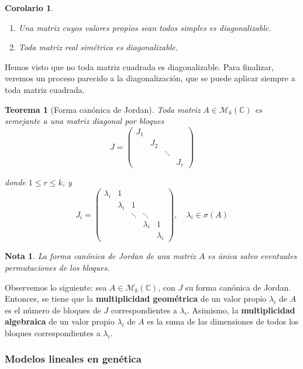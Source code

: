 \documentclass[11pt, a4paper]{article}
\newif\IfInSansMode
\numberwithin{equation}{section}
\newcommand{\la}{\lambda}
\theoremstyle{theorem-style}
\newtheorem{nth}{Teorema}[section]
\newtheorem{ncor}{Corolario}[section]
\theoremstyle{definition-style}
\theoremstyle{remark-style}
\newtheorem*{nota}{Nota}
\theoremstyle{example-style}
\newenvironment{nlist}
{\begin{enumerate}
    \renewcommand\labelenumi{(\emph{\roman{enumi})}}}
  {\end{enumerate}}
\begin{document}
\begin{ncor} \hfill
  \begin{nlist}
  \item Una matriz cuyos valores propios sean todos simples es diagonalizable.
  \item Toda matriz real simétrica es diagonalizable.
  \end{nlist}
\end{ncor}

Hemos visto que no toda matriz cuadrada es diagonalizable. Para finalizar, veremos un proceso parecido a la diagonalización, que se puede aplicar siempre a toda matriz cuadrada.

\begin{nth}[Forma canónica de Jordan]
  Toda matriz $A \in \mathcal M_k (\mathbb C)$ es semejante a una matriz
  diagonal por bloques $$ J =
  \begin{pmatrix}
    J_1 & & & \\
    & J_2 & & \\
    & & \ddots & \\
    & & & J_r
  \end{pmatrix}$$

  donde $1 \leq r \leq k$, y $$J_i = 
  \begin{pmatrix}
	\la_i & 1\\
	& \la_i & 1 \\
	& & \ddots & \ddots \\
	& & & \la_i & 1 \\
	& & & & \la_i
\end{pmatrix}, \quad \lambda_i \in \sigma(A)$$

\end{nth}

\begin{nota}
	La forma canónica de Jordan de una matriz $A$ es única salvo eventuales permutaciones de los bloques.
\end{nota}

Observemos lo siguiente: sea $A \in \mathcal M_k(\mathbb{C})$, con $J$ su forma canónica de Jordan. Entonces, se tiene que la \textbf{multiplicidad geométrica} de un valor propio $\lambda_i$ de $A$ es el número de bloques de $J$ correspondientes a $\lambda_i$. Asimismo, la \textbf{multiplicidad algebraica} de un valor propio $\lambda_i$ de $A$ es la suma de las dimensiones de todos los bloques correspondientes a $\lambda_i$.

\subsubsection{Modelos lineales en genética}
\end{document}
